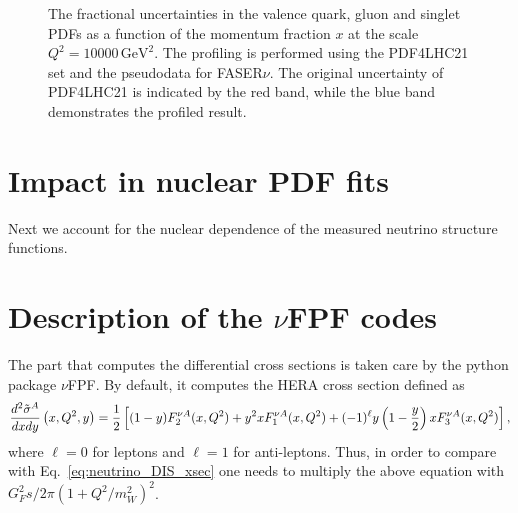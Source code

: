 \documentclass[11pt,a4paper]{article}
\newcommand{\lc}{\left[}
\newcommand{\rc}{\right]}
\newcommand{\lp}{\left(}
\newcommand{\rp}{\right)}
\def\frac#1#2{{{#1}\over {#2}}}
\numberwithin{equation}{section}
\numberwithin{figure}{section}
\numberwithin{table}{section}
\begin{document}
\begin{figure}[H]
\caption{The fractional uncertainties in the valence quark, gluon and singlet PDFs as a function of the momentum fraction $x$ at the scale $Q^2 = 10000 \, \textrm{GeV}^2$. The profiling is performed using the
PDF4LHC21 set and the pseudodata for FASER$\nu$. The original uncertainty of PDF4LHC21 is
indicated by the red band, while the blue band demonstrates the profiled result.}
\label{FASERv_profiling}
\end{figure}

\section{Impact in nuclear PDF fits}

Next we account for the nuclear dependence of
the measured neutrino structure functions.

\section{Description of the $\nu$FPF codes}

The part that computes the differential cross sections is taken care by the python
package $\nu$FPF. By default, it computes the HERA cross section defined as
\begin{equation}
    \frac{d^2\tilde{\sigma}^{A}}{dxdy} \lp x,Q^2,y \rp =  \frac{1}{2}\lc (1-y)F^{\nu A}_2(x,Q^2) + y^2xF^{\nu A}_1(x,Q^2)
    + (-1)^\ell  y\lp 1-\frac{y}{2}\rp xF^{\nu A}_3(x,Q^2)\rc ,
\end{equation}
where $\ell = 0$ for leptons and $\ell = 1$ for anti-leptons. Thus, in order to compare with 
Eq.~\ref{eq:neutrino_DIS_xsec} one needs to multiply the above equation with $G_F^2s/2 \pi (1 + Q^2/m^2_W)^2$.



\end{document}
